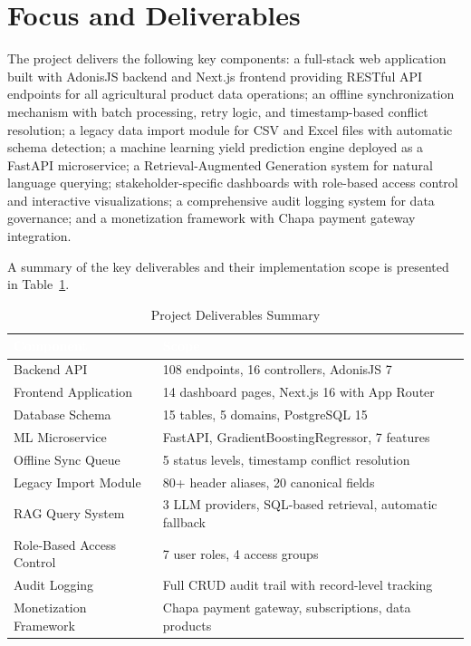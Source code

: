 \documentclass[12pt,a4paper,oneside]{report}
\begin{document}
\section{Focus and Deliverables}
The project delivers the following key components: a full-stack web application built with AdonisJS backend and Next.js frontend providing RESTful API endpoints for all agricultural product data operations; an offline synchronization mechanism with batch processing, retry logic, and timestamp-based conflict resolution; a legacy data import module for CSV and Excel files with automatic schema detection; a machine learning yield prediction engine deployed as a FastAPI microservice; a Retrieval-Augmented Generation system for natural language querying; stakeholder-specific dashboards with role-based access control and interactive visualizations; a comprehensive audit logging system for data governance; and a monetization framework with Chapa payment gateway integration.

A summary of the key deliverables and their implementation scope is presented in Table~\ref{tab:deliverables}.

\begin{table}[H]
\centering
\caption{Project Deliverables Summary}
\label{tab:deliverables}
\renewcommand{\arraystretch}{1.4}
\begin{tabularx}{\textwidth}{XX}
\toprule
\rowcolor{headerblue}
\textcolor{white}{\textbf{Component}} & \textcolor{white}{\textbf{Scope}} \\
\midrule
Backend API & 108 endpoints, 16 controllers, AdonisJS 7 \\
\rowcolor{rowalt}
Frontend Application & 14 dashboard pages, Next.js 16 with App Router \\
Database Schema & 15 tables, 5 domains, PostgreSQL 15 \\
\rowcolor{rowalt}
ML Microservice & FastAPI, GradientBoostingRegressor, 7 features \\
Offline Sync Queue & 5 status levels, timestamp conflict resolution \\
\rowcolor{rowalt}
Legacy Import Module & 80+ header aliases, 20 canonical fields \\
RAG Query System & 3 LLM providers, SQL-based retrieval, automatic fallback \\
\rowcolor{rowalt}
Role-Based Access Control & 7 user roles, 4 access groups \\
Audit Logging & Full CRUD audit trail with record-level tracking \\
\rowcolor{rowalt}
Monetization Framework & Chapa payment gateway, subscriptions, data products \\
\bottomrule
\end{tabularx}
\end{table}
\end{document}
